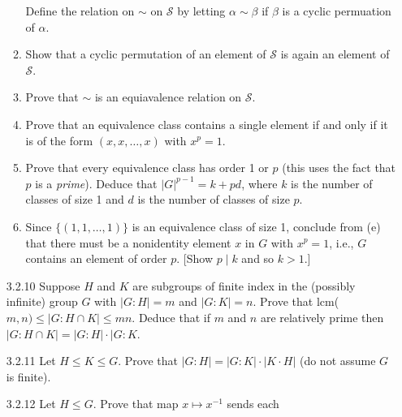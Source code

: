 \begin{enumerate}
\begin{enumerate}
                           Define the relation on $\sim$ on $\mathcal{S}$ by
                           letting $\alpha \sim \beta$ if $\beta$ is a cyclic
                           permuation of $\alpha$.
                     \item Show that a cyclic permutation of an element of
                           $\mathcal{S}$ is again an element of $\mathcal{S}$.
                     \item Prove that $\sim$ is an equiavalence relation on
                           $\mathcal{S}$.
                     \item Prove that an equivalence class contains a single
                           element if and only if it is of the form
                           $(x, x, \ldots, x)$ with $x^p = 1$.
                     \item Prove that every equivalence class has order 1 or $p$
                           (this uses the fact that $p$ is a \textit{prime}).
                           Deduce that $|G|^{p-1} = k + pd$, where $k$ is the
                           number of classes of size 1 and $d$ is the number of
                           classes of size $p$.
                     \item Since $\{(1, 1, \ldots, 1)\}$ is an equivalence class
                           of size 1, conclude from (e) that there must be a
                           nonidentity element $x$ in $G$ with $x^p = 1$, i.e.,
                           $G$ contains an element of order $p$. [Show
                           $p \mid k$ and so $k > 1$.]
                  \end{enumerate}                  
   \item[3.2.10]  Suppose $H$ and $K$ are subgroups of finite index in the
                  (possibly infinite) group $G$ with $|G : H| = m$ and
                  $|G : K| = n$. Prove that lcm($m, n) \le
                  |G : H \cap K| \le mn$. Deduce that if $m$ and $n$ are
                  relatively prime then $|G : H \cap K| = |G : H| \cdot |G : K$.
   \item[3.2.11]  Let $H \le K \le G$. Prove that
                  $|G : H| = |G : K| \cdot |K \cdot H|$ (do not assume $G$ is
                  finite).
   \item[3.2.12]  Let $H \le G$. Prove that map $x \mapsto x^{-1}$ sends each

\end{enumerate}
